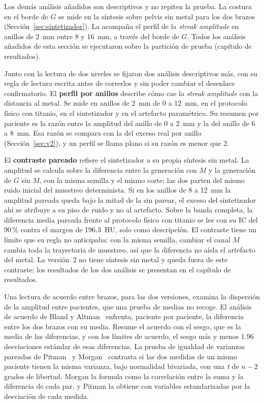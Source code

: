 Los demás análisis añadidos son descriptivos y no repiten la prueba. La costura en el borde de $G$ se mide en la síntesis sobre pelvis sin metal para los dos brazos (Sección~\ref{sec:sintetizador}). La acompaña el perfil de la \emph{streak amplitude} en anillos de 2~mm entre 8 y 16~mm, a través del borde de $G$. Todos los análisis añadidos de esta sección se ejecutaron sobre la partición de prueba (capítulo de resultados).

Junto con la lectura de dos niveles se fijaron dos análisis descriptivos más, con su regla de lectura escrita antes de correrlos y sin poder cambiar el desenlace confirmatorio. El \textbf{perfil por anillos} describe cómo cae la \emph{streak amplitude} con la distancia al metal. Se mide en anillos de 2~mm de 0 a 12~mm, en el protocolo físico con titanio, en el sintetizador y en el artefacto paramétrico. Su resumen por paciente es la razón entre la amplitud del anillo de 0 a 2~mm y la del anillo de 6 a 8~mm. Esa razón se compara con la del exceso real por anillo (Sección~\ref{sec:v2}), y un perfil se llama plano si su razón es menor que 2.

El \textbf{contraste pareado} refiere el sintetizador a su propia síntesis sin metal. La amplitud se calcula sobre la diferencia entre la generación con $M$ y la generación de $G$ sin $M$, con la misma semilla y el mismo corte; las dos parten del mismo ruido inicial del muestreo determinista. Si en los anillos de 8 a 12~mm la amplitud pareada queda bajo la mitad de la sin parear, el exceso del sintetizador ahí se atribuye a su piso de ruido y no al artefacto. Sobre la banda completa, la diferencia media pareada frente al protocolo físico con titanio se lee con su IC del 90\,\% contra el margen de 196.3~HU, solo como descripción. El contraste tiene un límite que su regla no anticipaba: con la misma semilla, cambiar el canal $M$ cambia toda la trayectoria de muestreo, así que la diferencia no aísla el artefacto del metal. La versión~2 no tiene síntesis sin metal y queda fuera de este contraste; los resultados de los dos análisis se presentan en el capítulo de resultados.

Una lectura de acuerdo entre brazos, para las dos versiones, examina la dispersión de la amplitud entre pacientes, que una prueba de medias no recoge. El análisis de acuerdo de Bland y Altman~\cite{bland1986statisticalmeasurement} enfrenta, paciente por paciente, la diferencia entre los dos brazos con su media. Resume el acuerdo con el sesgo, que es la media de las diferencias, y con los límites de acuerdo, el sesgo más y menos 1.96 desviaciones estándar de esas diferencias. La prueba de igualdad de varianzas pareadas de Pitman~\cite{pitman1939note} y Morgan~\cite{morgan1939test} contrasta si las dos medidas de un mismo paciente tienen la misma varianza, bajo normalidad bivariada, con una \emph{t} de $n - 2$ grados de libertad. Morgan la formula como la correlación entre la suma y la diferencia de cada par, y Pitman la obtiene con variables estandarizadas por la desviación de cada medida.

